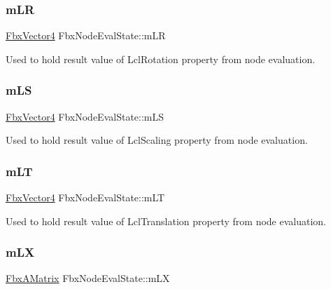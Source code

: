 \subsubsection{\texorpdfstring{m\+LR}{mLR}}
{\footnotesize\ttfamily \hyperlink{class_fbx_vector4}{Fbx\+Vector4} Fbx\+Node\+Eval\+State\+::m\+LR}



Used to hold result value of Lcl\+Rotation property from node evaluation. 

\mbox{\label{class_fbx_node_eval_state_a6e1f5d4bf262b03068164d7d0e3641bd}} 
\subsubsection{\texorpdfstring{m\+LS}{mLS}}
{\footnotesize\ttfamily \hyperlink{class_fbx_vector4}{Fbx\+Vector4} Fbx\+Node\+Eval\+State\+::m\+LS}



Used to hold result value of Lcl\+Scaling property from node evaluation. 

\mbox{\label{class_fbx_node_eval_state_a06f62c625cb7095d6334a21ba5cde42d}} 
\subsubsection{\texorpdfstring{m\+LT}{mLT}}
{\footnotesize\ttfamily \hyperlink{class_fbx_vector4}{Fbx\+Vector4} Fbx\+Node\+Eval\+State\+::m\+LT}



Used to hold result value of Lcl\+Translation property from node evaluation. 

\mbox{\label{class_fbx_node_eval_state_a54312754ca26de28be9272c304e7ba4f}} 
\subsubsection{\texorpdfstring{m\+LX}{mLX}}
{\footnotesize\ttfamily \hyperlink{class_fbx_a_matrix}{Fbx\+A\+Matrix} Fbx\+Node\+Eval\+State\+::m\+LX}



